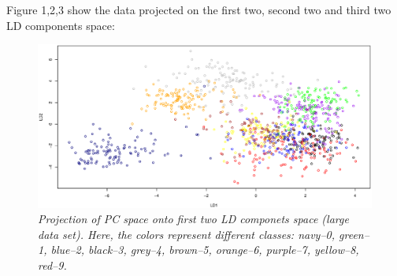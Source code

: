 \documentclass{article}
\begin{document}
 
Figure 1,2,3 show the data projected on the first two, second two and third two LD components space:

\begin{figure}[htp]
\centering
\includegraphics[width=12.1cm]{large_pcalda_LD12_train.eps}
\caption{\textit{Projection of PC space onto first two LD componets space (large data set). Here, the colors represent different classes: navy--0, green--1, 
blue--2, black--3, grey--4, brown--5, orange--6, purple--7, yellow--8, red--9.}}
\end{figure}
\end{document}
